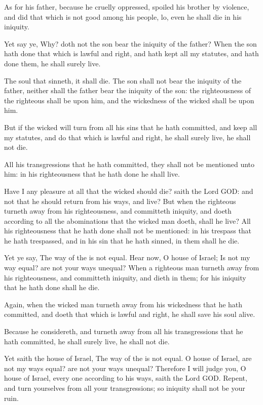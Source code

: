 \verse As for his father, because he cruelly oppressed, spoiled his brother by violence, and did that which is not good among his people, lo, even he shall die in his iniquity.

\verse Yet say ye, Why? doth not the son bear the iniquity of the father?  When the son hath done that which is lawful and right, and hath kept all my statutes, and hath done them, he shall surely live.

\verse The soul that sinneth, it shall die. The son shall not bear the iniquity of the father, neither shall the father bear the iniquity of the son: the righteousness of the righteous shall be upon him, and the wickedness of the wicked shall be upon him.

\verse But if the wicked will turn from all his sins that he hath committed, and keep all my statutes, and do that which is lawful and right, he shall surely live, he shall not die.

\verse All his transgressions that he hath committed, they shall not be mentioned unto him: in his righteousness that he hath done he shall live.

\verse Have I any pleasure at all that the wicked should die? saith the Lord GOD: and not that he should return from his ways, and live?  \verse But when the righteous turneth away from his righteousness, and committeth iniquity, and doeth according to all the abominations that the wicked man doeth, shall he live? All his righteousness that he hath done shall not be mentioned: in his trespass that he hath trespassed, and in his sin that he hath sinned, in them shall he die.

\verse Yet ye say, The way of the \LORD is not equal. Hear now, O house of Israel; Is not my way equal? are not your ways unequal?  \verse When a righteous man turneth away from his righteousness, and committeth iniquity, and dieth in them; for his iniquity that he hath done shall he die.

\verse Again, when the wicked man turneth away from his wickedness that he hath committed, and doeth that which is lawful and right, he shall save his soul alive.

\verse Because he considereth, and turneth away from all his transgressions that he hath committed, he shall surely live, he shall not die.

\verse Yet saith the house of Israel, The way of the \LORD is not equal.  O house of Israel, are not my ways equal? are not your ways unequal?  \verse Therefore I will judge you, O house of Israel, every one according to his ways, saith the Lord GOD. Repent, and turn yourselves from all your transgressions; so iniquity shall not be your ruin.

